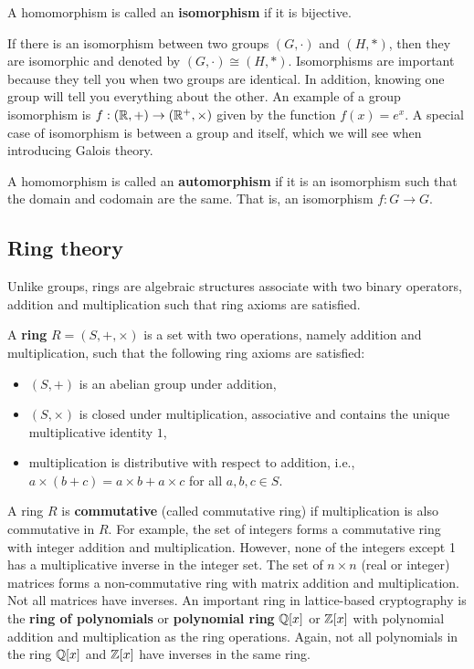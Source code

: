 \documentclass[../main.tex]{subfiles}
\begin{document}
\begin{definition}
A homomorphism is called an \textbf{isomorphism}\reversemarginpar
{} if it is bijective. 
\end{definition}
If there is an isomorphism between two groups $(G,\cdot)$ and $(H,*)$, then they are isomorphic and denoted by $(G,\cdot) \cong (H,*)$. Isomorphisms are important because they tell you when two groups are identical. In addition, knowing one group will tell you everything about the other. An example of a group isomorphism is $f: (\mathbb{R}, +) \rightarrow (\mathbb{R}^+, \times)$ given by the function $f(x) = e^x$. A special case of isomorphism is between a group and itself, which we will see when introducing Galois theory. 

\begin{definition}
A homomorphism is called an \textbf{automorphism} if it is an isomorphism such that the domain and codomain are the same. That is, an isomorphism $f: G \rightarrow G$.
\end{definition}


\subsection{Ring theory}
\label{subsection:ring theory}
Unlike groups, rings are algebraic structures associate with two binary operators, addition and multiplication such that ring axioms are satisfied. 

\begin{definition}
A \textbf{ring} $R=(S,+, \times)$\reversemarginpar
{}
 is a set with two operations, namely addition and multiplication, such that the following ring axioms are satisfied:
\begin{itemize}
    \item $(S,+)$ is an abelian group under addition, 
    \item $(S,\times)$ is closed under multiplication, associative and contains the unique multiplicative identity $1$,
    \item multiplication is distributive with respect to addition, i.e., $a \times (b + c) = a \times b + a \times c$ for all $a, b, c\in S$.
\end{itemize}
\end{definition}

A ring $R$ is \textbf{commutative} (called commutative ring) if multiplication is also commutative in $R$. For example, the set of integers forms a commutative ring with integer addition and multiplication. However, none of the integers except 1 has a multiplicative inverse in the integer set. The set of $n \times n$ (real or integer) matrices forms a non-commutative ring with matrix addition and multiplication. Not all matrices have inverses. 
An important ring in lattice-based cryptography is the \textbf{ring of polynomials} or \textbf{polynomial ring} $\mathbb{Q}[x]$ or $\mathbb{Z}[x]$ with polynomial addition and multiplication as the ring operations. Again, not all polynomials in the ring $\mathbb{Q}[x]$ and $\mathbb{Z}[x]$ have inverses in the same ring. 
\end{document}
